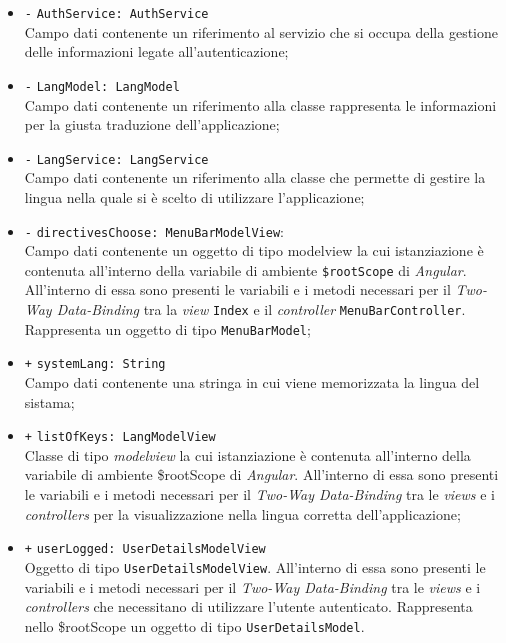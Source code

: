 \begin{itemize}
\begin{itemize}
		\item \texttt{-} \texttt{AuthService: AuthService} \\
		Campo dati contenente un riferimento al servizio che si occupa della gestione delle informazioni legate all’autenticazione;
		\item \texttt{-} \texttt{LangModel: LangModel} \\
		Campo dati contenente un riferimento alla classe rappresenta le informazioni per la giusta traduzione dell'applicazione;
		\item \texttt{-} \texttt{LangService: LangService} \\
		Campo dati contenente un riferimento alla classe che permette di gestire la lingua nella quale si è scelto di utilizzare l'applicazione;
		\item \texttt{-} \texttt{directivesChoose: MenuBarModelView}: \\
		Campo dati contenente un oggetto di tipo modelview la cui istanziazione è contenuta all'interno della variabile di ambiente \texttt{\$rootScope} di \textit{Angular}. All'interno di essa sono presenti le variabili e i metodi necessari per il \textit{Two-Way Data-Binding} tra la \textit{view} \texttt{Index} e il \textit{controller} \texttt{MenuBarController}. Rappresenta un oggetto di tipo \texttt{MenuBarModel};
		\item \texttt{+} \texttt{systemLang: String} \\
		Campo dati contenente una stringa in cui viene memorizzata la lingua del sistama;
		\item \texttt{+} \texttt{listOfKeys: LangModelView}\\ 
		Classe di tipo \textit{modelview} la cui istanziazione è contenuta all'interno della variabile di ambiente \$rootScope di \textit{Angular}. All'interno di essa sono presenti le variabili e i metodi necessari per il \textit{Two-Way Data-Binding} tra le \textit{views} e i \textit{controllers} per la visualizzazione nella lingua corretta dell'applicazione;
		\item \texttt{+} \texttt{userLogged: UserDetailsModelView} \\
		Oggetto di tipo \texttt{UserDetailsModelView}. All'interno di essa sono presenti le variabili e i metodi necessari per il \textit{Two-Way Data-Binding} tra le \textit{views} e i \textit{controllers} che necessitano di utilizzare l'utente autenticato. Rappresenta nello \$rootScope un oggetto di tipo \texttt{UserDetailsModel}.

\end{itemize}
\end{itemize}
